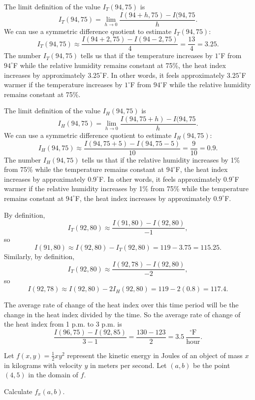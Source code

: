 \begin{exercises}
\begin{exerciseSolution}
\ba
   	\item The limit definition of the value $I_T(94,75)$ is
\[I_T(94,75) = \lim_{h \to 0} \frac{I(94+h,75)-I(94,75}{h}.\]
We can use a symmetric difference quotient to estimate $I_T(94,75)$:
\[I_T(94,75) \approx \frac{I(94+2,75)-I(94-2,75)}{4} = \frac{13}{4} = 3.25.\]
The number $I_T(94,75)$ tells us that if the temperature increases by $1^{\circ}$F from $94^{\circ}$F while the relative humidity remains constant at 75\%, the heat index increases by approximately $3.25^{\circ}$F. In other words, it feels approximately $3.25^{\circ}$F warmer if the temperature increases by $1^{\circ}$F from $94^{\circ}$F while the relative humidity remains constant at 75\%.
	
	\item The limit definition of the value $I_H(94,75)$ is
\[I_H(94,75) = \lim_{h \to 0} \frac{I(94,75+h)-I(94,75}{h}.\]
We can use a symmetric difference quotient to estimate $I_H(94,75)$:
\[I_H(94,75) \approx \frac{I(94,75+5)-I(94,75-5)}{10} = \frac{9}{10} = 0.9.\]
The number $I_H(94,75)$ tells us that if the relative humidity increases by 1\% from 75\% while the temperature remains constant at $94^{\circ}$F, the heat index increases by approximately $0.9^{\circ}$F. In other words, it feels approximately $0.9^{\circ}$F warmer if the relative humidity increases by 1\% from 75\% while the temperature remains constant at $94^{\circ}$F, the heat index increases by approximately $0.9^{\circ}$F.
	
	\item By definition,  
\[I_T(92,80) \approx \frac{I(91,80)-I(92,80)}{-1},\]
so 
	\[I(91,80) \approx I(92,80) - I_T(92,80) = 119-3.75 = 115.25.\]
Similarly, by definition,  
\[I_T(92,80) \approx \frac{I(92,78)-I(92,80)}{-2},\]
so 
	\[I(92,78) \approx I(92,80) - 2I_H(92,80) = 119-2(0.8) = 117.4.\]

	\item The average rate of change of the heat index over this time period will be the change in the heat index divided by the time. So the average rate of change of the heat index from 1 p.m. to 3 p.m. is 
\[\frac{I(96,75)-I(92,85)}{3-1} = \frac{130-123}{2} = 3.5 \ \frac{^{\circ}\text{F}}{\text{hour}}.\]
\ea

\end{exerciseSolution}

\item \label{Ez:10.2.1.5} Let $f(x,y) = \frac{1}{2}xy^2$ represent the kinetic energy in Joules of an object of mass $x$ in kilograms with velocity $y$ in meters per second. Let $(a,b)$ be the point $(4,5)$ in the domain of $f$.
    \ba
    \item Calculate $f_x(a,b)$.
    

\end{exercises}
